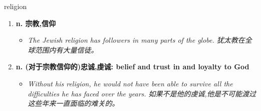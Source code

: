 
\begin{frame}
{\huge religion}
\begin{center}
\begin{enumerate}\Large
  \item \textbf{n. 宗教,信仰}
  \begin{itemize}
    \item \em{\Large{The Jewish religion has followers in many parts of the globe. 犹太教在全球范围内有大量信徒。}}
  \end{itemize}
  \item \textbf{n. (对于宗教信仰的)忠诚,虔诚: belief and trust in and loyalty to God}
  \begin{itemize}
    \item \em{\Large{Without his religion, he would not have been able to survive all the difficulties he has faced over the years. 如果不是他的虔诚,他是不可能渡过这些年来一直面临的难关的。}}
  \end{itemize}
\end{enumerate}
\end{center}
\end{frame}
